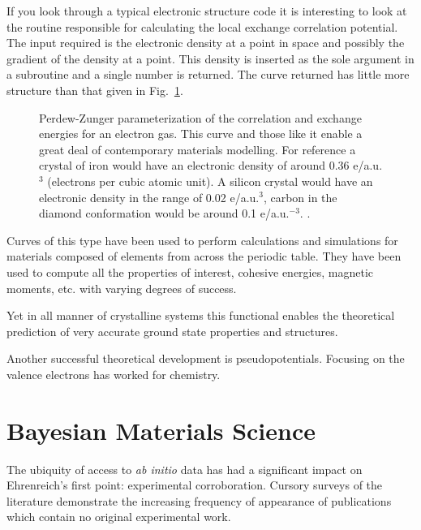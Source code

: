 If you look through a typical electronic structure code it is interesting to look at the routine
responsible for calculating the local exchange correlation potential. The input required is the 
electronic density at a point in space and possibly the gradient of the density at a point. This 
density is inserted as the sole argument in a subroutine and a single number is returned. The curve
returned has little more structure than that given in Fig.~\ref{fig:ldapz}. 
%
\begin{figure}
\begin{center}
\graphicspath{{./intro/}}
\caption{Perdew-Zunger parameterization of the correlation and exchange energies for an electron gas.
This curve and those like it enable a great deal of contemporary materials modelling. For reference
a crystal of iron would have an electronic density of around 0.36 e/a.u.$^{3}$ (electrons per cubic
atomic unit). A silicon crystal would have an electronic density in the range of 0.02 e/a.u.$^{3}$,
carbon in the diamond conformation would be around 0.1 e/a.u.$^{-3}$.  
\label{fig:ldapz}.}
\end{center}
\end{figure}
%
Curves of this type have been used to perform calculations and simulations for 
materials composed of elements from across the periodic table. They have been
used to compute all the properties of interest, cohesive energies, magnetic moments,
etc. with varying degrees of success.

Yet in all manner of crystalline systems this functional enables the theoretical
prediction of very accurate ground state properties and structures. 

Another successful theoretical development is pseudopotentials. Focusing on the valence electrons 
has worked for chemistry.

\section{Bayesian Materials Science}
The ubiquity of access to {\it ab initio} data has had a significant impact on 
Ehrenreich's first point: experimental corroboration. 
Cursory surveys of the literature demonstrate the increasing frequency of 
appearance of publications which contain no original experimental work. 

